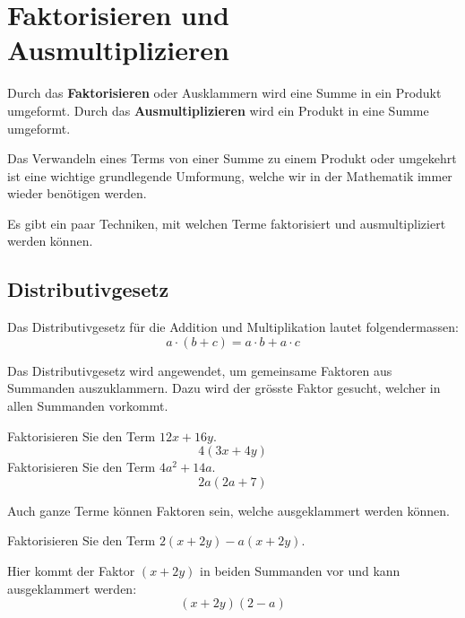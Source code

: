 \newpage
\section{Faktorisieren und Ausmultiplizieren}
Durch das \textbf{Faktorisieren} oder Ausklammern wird eine Summe in ein Produkt umgeformt. Durch das \textbf{Ausmultiplizieren} wird ein Produkt in eine Summe umgeformt.

\begin{center}
\end{center}

Das Verwandeln eines Terms von einer Summe zu einem Produkt oder umgekehrt ist eine wichtige grundlegende Umformung, welche wir in der Mathematik immer wieder benötigen werden.

Es gibt ein paar Techniken, mit welchen Terme faktorisiert und ausmultipliziert werden können.

\subsection{Distributivgesetz}

Das Distributivgesetz für die Addition und Multiplikation lautet folgendermassen:
\[
  a\cdot(b+c) = a\cdot b + a\cdot c
\]

Das Distributivgesetz wird angewendet, um gemeinsame Faktoren aus Summanden auszuklammern. Dazu wird der grösste Faktor gesucht, welcher in allen Summanden vorkommt.

\begin{example}
  Faktorisieren Sie den Term $12x+16y$.
  \[
    4(3x+4y)
  \]
  Faktorisieren Sie den Term $4a^{2}+14a$.
  \[
    2a(2a+7)
  \]
\end{example}

Auch ganze Terme können Faktoren sein, welche ausgeklammert werden können.

\begin{example}
  Faktorisieren Sie den Term $2(x+2y)-a(x+2y)$.

  Hier kommt der Faktor $(x+2y)$ in beiden Summanden vor und kann ausgeklammert werden:
  \[
    (x+2y)(2-a)
  \]
\end{example}

